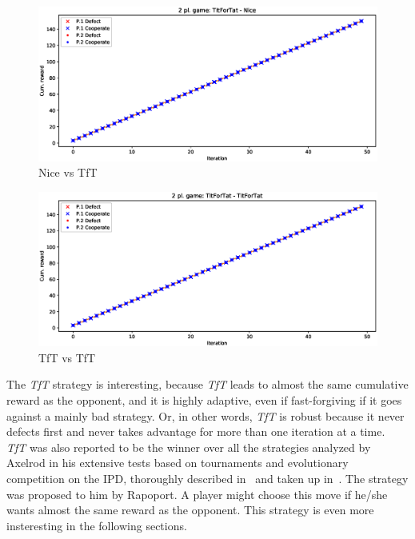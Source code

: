 \documentclass[journal,a4paper,10pt,twoside]{IEEEtran} %
\begin{document}
\begin{figure}[!ht]
    \centering
    \includegraphics[width=1\columnwidth]{../img/ipd2p/ipd2p-rewards-TitForTat-Nice}
    \caption{Nice vs TfT}
    \label{fig:nicevstft}
\end{figure}

\begin{figure}[!ht]
    \centering
    \includegraphics[width=1\columnwidth]{../img/ipd2p/ipd2p-rewards-TitForTat-TitForTat}
    \caption{TfT vs TfT}
    \label{fig:tftvstft}
\end{figure}

The \textit{TfT} strategy is interesting, because \textit{TfT} leads to almost the same cumulative reward as the opponent, and it is highly adaptive, even if fast-forgiving if it goes against a mainly bad strategy.
Or, in other words, \textit{TfT} is robust because it never defects first and never takes advantage for more than one iteration at a time.~\cite{fogelEvolvingBehaviors}
\textit{TfT} was also reported to be the winner over all the strategies analyzed by Axelrod in his extensive tests based on tournaments and evolutionary competition on the IPD, thoroughly described in~\cite{axelrod1981evolution,axelrod1984evolution} and taken up in~\cite{mathieu2017}.
The strategy was proposed to him by Rapoport.
A player might choose this move if he/she wants almost the same reward as the opponent. This strategy is even more insteresting in the following sections.
\end{document}
